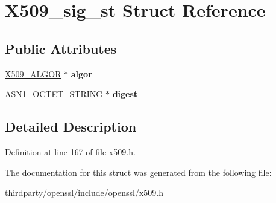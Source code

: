 \hypertarget{struct_x509__sig__st}{}\section{X509\+\_\+sig\+\_\+st Struct Reference}
\label{struct_x509__sig__st}
\subsection*{Public Attributes}
\begin{DoxyCompactItemize}
\item 
\mbox{\label{struct_x509__sig__st_a40608d2e687f0fd15132db525c18db60}} 
\hyperlink{struct_x509__algor__st}{X509\+\_\+\+A\+L\+G\+OR} $\ast$ {\bfseries algor}
\item 
\mbox{\label{struct_x509__sig__st_aef06b1dae888d04a2cdf2f85208d0ba2}} 
\hyperlink{structasn1__string__st}{A\+S\+N1\+\_\+\+O\+C\+T\+E\+T\+\_\+\+S\+T\+R\+I\+NG} $\ast$ {\bfseries digest}
\end{DoxyCompactItemize}


\subsection{Detailed Description}


Definition at line 167 of file x509.\+h.



The documentation for this struct was generated from the following file\+:\begin{DoxyCompactItemize}
\item 
thirdparty/openssl/include/openssl/x509.\+h\end{DoxyCompactItemize}
